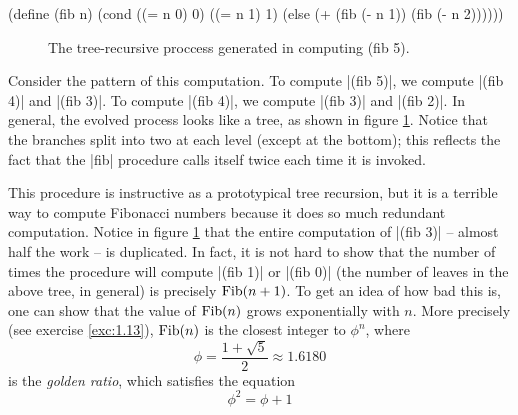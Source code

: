 \begin{schemedisplay}
(define (fib n)
  (cond ((= n 0) 0)
        ((= n 1) 1)
        (else (+ (fib (- n 1))
                 (fib (- n 2))))))
\end{schemedisplay}

\begin{figure}
\caption{The tree-recursive proccess generated in computing (fib 5).}
\label{fig:1.5}
\end{figure}

Consider the pattern of this computation.  To compute \scheme|(fib 5)|,
we compute \scheme|(fib 4)| and \scheme|(fib 3)|.  To compute \scheme|(fib 4)|,
we compute \scheme|(fib 3)| and \scheme|(fib 2)|.  In general, the evolved
process looks like a tree, as shown in figure \ref{fig:1.5}.
Notice that the branches split into two at each level (except at the
bottom); this reflects the fact that the \scheme|fib| procedure calls
itself twice each time it is invoked.


This procedure is instructive as a prototypical tree recursion, but it
is a terrible way to compute Fibonacci numbers because it does so much
redundant computation.  Notice in figure \ref{fig:1.5} that the entire
computation of \scheme|(fib 3)| -- almost half the work -- is
duplicated.  In fact, it is not hard to show that the number of times
the procedure will compute \scheme|(fib 1)| or \scheme|(fib 0)| (the
number of leaves in the above tree, in general) is precisely ${\rm
  Fib}(n+1)$.  To get an idea of how bad this is, one can show that
the value of ${\rm Fib}(n)$ grows exponentially with $n$.  More
precisely (see exercise \ref{exc:1.13}), ${\rm Fib}(n)$ is the closest
integer to $\phi^n$, where $$\phi = \frac{1 + \sqrt 5}{2} \approx
1.6180$$ is the \textit{golden ratio}, which satisfies the
equation $$\phi^2 = \phi+1$$

